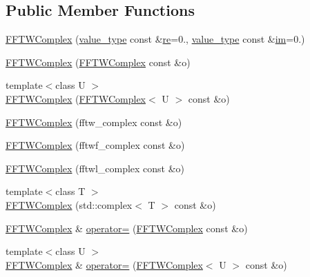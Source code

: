 \subsection*{Public Member Functions}
\begin{DoxyCompactItemize}
\item 
\hyperlink{class_f_f_t_w_complex_a76cefd3e730a82653e6daee70f2d89df}{F\-F\-T\-W\-Complex} (\hyperlink{class_f_f_t_w_complex_af159fb8086896f4f62494d72ce0f9d38}{value\-\_\-type} const \&\hyperlink{class_f_f_t_w_complex_a2f2dc7efdf2028595282d65ac0d78b67}{re}=0., \hyperlink{class_f_f_t_w_complex_af159fb8086896f4f62494d72ce0f9d38}{value\-\_\-type} const \&\hyperlink{class_f_f_t_w_complex_ac4b43ad04b92e0c8d737b339dfba0449}{im}=0.)
\item 
\hyperlink{class_f_f_t_w_complex_a2997e943be9a8760572d7eb57a835578}{F\-F\-T\-W\-Complex} (\hyperlink{class_f_f_t_w_complex}{F\-F\-T\-W\-Complex} const \&o)
\item 
{\footnotesize template$<$class U $>$ }\\\hyperlink{class_f_f_t_w_complex_a5e7393a3aadd851d1a821b532dfb2897}{F\-F\-T\-W\-Complex} (\hyperlink{class_f_f_t_w_complex}{F\-F\-T\-W\-Complex}$<$ U $>$ const \&o)
\item 
\hyperlink{class_f_f_t_w_complex_a78a3dcb5ad735dcbcb7c33819143340c}{F\-F\-T\-W\-Complex} (fftw\-\_\-complex const \&o)
\item 
\hyperlink{class_f_f_t_w_complex_a35285c1337c6deeb40e7a6b4e0bae0dc}{F\-F\-T\-W\-Complex} (fftwf\-\_\-complex const \&o)
\item 
\hyperlink{class_f_f_t_w_complex_a611abacd68fb6dc2af51bb04f967ced4}{F\-F\-T\-W\-Complex} (fftwl\-\_\-complex const \&o)
\item 
{\footnotesize template$<$class T $>$ }\\\hyperlink{class_f_f_t_w_complex_a251490536dfd09ac344796877514a4fe}{F\-F\-T\-W\-Complex} (std\-::complex$<$ T $>$ const \&o)
\item 
\hyperlink{class_f_f_t_w_complex}{F\-F\-T\-W\-Complex} \& \hyperlink{class_f_f_t_w_complex_aa4971274774632da9b66858dfe78af52}{operator=} (\hyperlink{class_f_f_t_w_complex}{F\-F\-T\-W\-Complex} const \&o)
\item 
{\footnotesize template$<$class U $>$ }\\\hyperlink{class_f_f_t_w_complex}{F\-F\-T\-W\-Complex} \& \hyperlink{class_f_f_t_w_complex_abbc179b01de79f8db14a14e8c6c69988}{operator=} (\hyperlink{class_f_f_t_w_complex}{F\-F\-T\-W\-Complex}$<$ U $>$ const \&o)
\item 

\end{DoxyCompactItemize}
